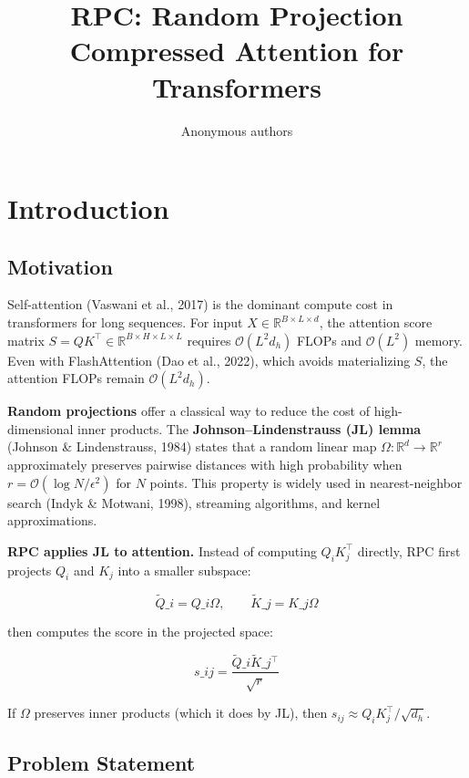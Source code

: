 \title{\textbf{RPC: Random Projection Compressed Attention for Transformers}}

\author{Anonymous authors}



\section{Introduction}

\subsection{Motivation}

Self-attention (Vaswani et al., 2017) is the dominant compute cost in 
transformers for long sequences. For input $X \in \mathbb{R}^{B \times L \times d}$, 
the attention score matrix $S = Q K^\top \in \mathbb{R}^{B \times H \times L \times L}$ 
requires $\mathcal{O}(L^2 d_h)$ FLOPs and $\mathcal{O}(L^2)$ memory. Even 
with FlashAttention (Dao et al., 2022), which avoids materializing $S$, the 
attention FLOPs remain $\mathcal{O}(L^2 d_h)$.

\textbf{Random projections} offer a classical way to reduce the cost of 
high-dimensional inner products. The \textbf{Johnson--Lindenstrauss (JL) lemma} 
(Johnson \& Lindenstrauss, 1984) states that a random linear map 
$\Omega : \mathbb{R}^d \to \mathbb{R}^r$ approximately preserves pairwise 
distances with high probability when $r = \mathcal{O}(\log N / \epsilon^2)$ 
for $N$ points. This property is widely used in nearest-neighbor search 
(Indyk \& Motwani, 1998), streaming algorithms, and kernel approximations.

\textbf{RPC applies JL to attention.} Instead of computing $Q_i K_j^\top$ directly, 
RPC first projects $Q_i$ and $K_j$ into a smaller subspace:

\[
\tilde{Q}\_i = Q\_i \Omega, \qquad \tilde{K}\_j = K\_j \Omega
\tag{1.1}
\]

then computes the score in the projected space:

\[
s\_{ij} = \frac{\tilde{Q}\_i \tilde{K}\_j^\top}{\sqrt{r}}
\tag{1.2}
\]

If $\Omega$ preserves inner products (which it does by JL), then 
$s_{ij} \approx Q_i K_j^\top / \sqrt{d_h}$.

\subsection{Problem Statement}

